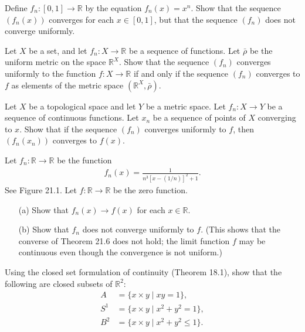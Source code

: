 \begin{exercise}[Munkres 21.6]
  Define $f_n : [0, 1] \to \mathbb{R}$ by the equation $f_n(x) = x^n$. Show that the sequence $(f_n(x))$ converges for each $x \in [0, 1]$, but that the sequence $(f_n)$ does not converge uniformly.
\end{exercise}

\begin{exercise}[Munkres 21.7]
  Let $X$ be a set, and let $f_n : X \to \mathbb{R}$ be a sequence of functions. Let $\bar{\rho}$ be the uniform metric on the space $\mathbb{R}^X$. Show that the sequence $(f_n)$ converges uniformly to the function $f : X \to \mathbb{R}$ if and only if the sequence $(f_n)$ converges to $f$ as elements of the metric space $(\mathbb{R}^X, \bar{\rho})$.
\end{exercise}

\begin{exercise}[Munkres 21.8]
  Let $X$ be a topological space and let $Y$ be a metric space. Let $f_n : X \to Y$ be a sequence of continuous functions. Let $x_n$ be a sequence of points of $X$ converging to $x$. Show that if the sequence $(f_n)$ converges uniformly to $f$, then $(f_n(x_n))$ converges to $f(x)$.
\end{exercise}

\begin{exercise}[Munkres 21.9]
  Let $f_n : \mathbb{R} \to \mathbb{R}$ be the function
  \begin{align*}
    f_n(x) = \frac{1}{n^3[x - (1/n)]^2 + 1}.
  \end{align*}
  See Figure 21.1. Let $f : \mathbb{R} \to \mathbb{R}$ be the zero function.
  \begin{enumerate} 
    \item[(a)] Show that $f_n(x) \to f(x)$ for each $x \in \mathbb{R}$.
    \item[(b)] Show that $f_n$ does not converge uniformly to $f$. (This shows that the converse of Theorem 21.6 does not hold; the limit function $f$ may be continuous even though the convergence is not uniform.)
  \end{enumerate}
\end{exercise}

\begin{exercise}[Munkres 21.10]
  Using the closed set formulation of continuity (Theorem 18.1), show that the following are closed subsets of $\mathbb{R}^2$:
  \begin{align*}
    A &= \{x \times y \mid xy = 1\}, \\
    S^1 &= \{x \times y \mid x^2 + y^2 = 1\}, \\
    B^2 &= \{x \times y \mid x^2 + y^2 \leq 1\}.
  \end{align*}
\end{exercise}

